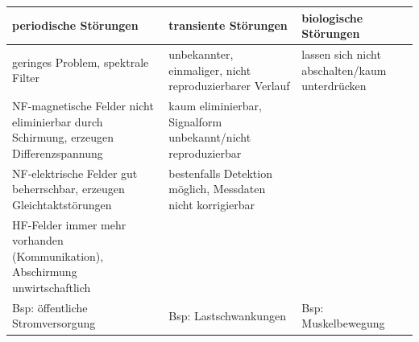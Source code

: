 \documentclass[10pt, a4paper]{exam}
\begin{document}
\begin{questions}
\begin{parts}
\begin{solution}
      \begin{tabular}{p{5cm}|p{5cm}|p{5cm}}
        periodische Störungen                                                                & transiente Störungen                                         & biologische Störungen                          \\\hline
        geringes Problem, spektrale Filter                                                   & unbekannter, einmaliger, nicht reproduzierbarer Verlauf      & lassen sich nicht abschalten/kaum unterdrücken \\
        NF-magnetische Felder nicht eliminierbar durch Schirmung, erzeugen Differenzspannung & kaum eliminierbar, Signalform unbekannt/nicht reproduzierbar                                                  \\\hline
        NF-elektrische Felder gut beherrschbar, erzeugen Gleichtaktstörungen                 & bestenfalls Detektion möglich, Messdaten nicht korrigierbar                                                   \\\hline
        HF-Felder immer mehr vorhanden (Kommunikation), Abschirmung unwirtschaftlich         &                                                                                                               \\\hline
        Bsp: öffentliche Stromversorgung                                                     & Bsp: Lastschwankungen                                        & Bsp: Muskelbewegung                            \\
      \end{tabular}

    \end{solution}


\end{parts}
\end{questions}
\end{document}
